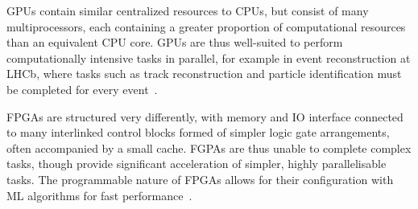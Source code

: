 GPUs contain similar centralized resources to CPUs, but consist of many multiprocessors, each containing a greater proportion of computational resources than an equivalent CPU core. GPUs are thus well-suited to perform computationally intensive tasks in parallel, for example in event reconstruction at LHCb, where tasks such as track reconstruction and particle identification must be completed for every event~\cite{vomBruch-gpus}.

FPGAs are structured very differently, with memory and IO interface connected to many interlinked control blocks formed of simpler logic gate arrangements, often accompanied by a small cache. FGPAs are thus unable to complete complex tasks, though provide significant acceleration of simpler, highly parallelisable tasks. The programmable nature of FPGAs allows for their configuration with ML algorithms for fast performance~\cite{duarte-fpgas, muons-fpgas}.